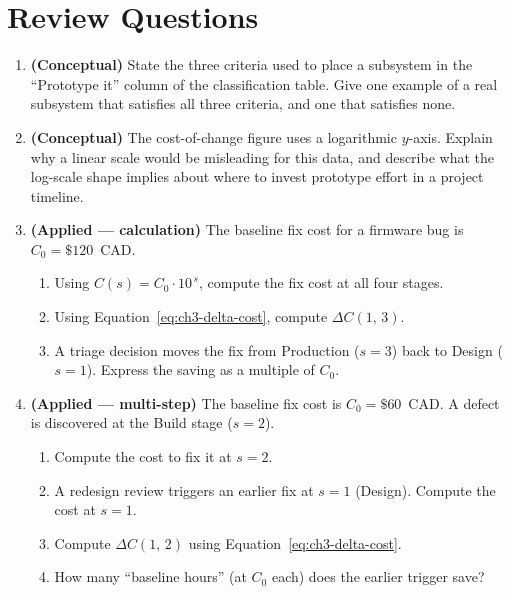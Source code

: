 \section*{Review Questions}

\begin{enumerate}

  \item \textbf{(Conceptual)} State the three criteria used to place a subsystem
  in the ``Prototype it'' column of the classification table.
  Give one example of a real subsystem that satisfies all three criteria, and one
  that satisfies none.

  \item \textbf{(Conceptual)} The cost-of-change figure uses a logarithmic
  $y$-axis. Explain why a linear scale would be misleading for this data, and
  describe what the log-scale shape implies about where to invest prototype effort
  in a project timeline.

  \item \textbf{(Applied --- calculation)} The baseline fix cost for a firmware
  bug is $C_0 = \$120$~CAD.
  \begin{enumerate}
    \item Using $C(s) = C_0 \cdot 10^{\,s}$, compute the fix cost at all four
          stages.
    \item Using Equation~\ref{eq:ch3-delta-cost}, compute $\Delta C(1,\,3)$.
    \item A triage decision moves the fix from Production ($s=3$) back to Design
          ($s=1$). Express the saving as a multiple of $C_0$.
  \end{enumerate}

  \item \textbf{(Applied --- multi-step)} The baseline fix cost is $C_0 = \$60$~CAD.
  A defect is discovered at the Build stage ($s=2$).
  \begin{enumerate}
    \item Compute the cost to fix it at $s=2$.
    \item A redesign review triggers an earlier fix at $s=1$ (Design).
          Compute the cost at $s=1$.
    \item Compute $\Delta C(1,\,2)$ using Equation~\ref{eq:ch3-delta-cost}.
    \item How many ``baseline hours'' (at $C_0$ each) does the earlier trigger save?
  \end{enumerate}


\end{enumerate}
